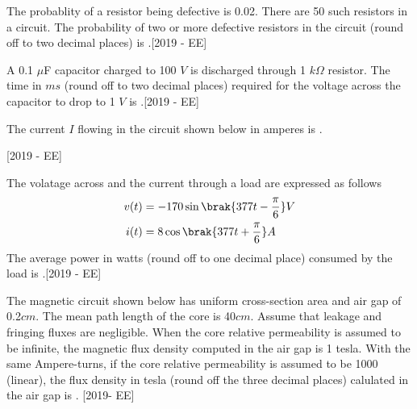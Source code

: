 \iffalse
\title{}
\author{EE24BTECH11053 - S A Aravind Eswar
}
\chapter{2019}
\section{ee}
\fi
    \item The probablity of a resistor being defective is 0.02. There are 50 such resistors in a circuit. The probability of two or more defective resistors in the circuit (round off to two decimal places) is \underline{\hspace{3cm}}.\hfill{[2019 - EE]}
    \item A 0.1 $\mu$F capacitor charged to 100 $V$ is discharged through  1 $k\Omega$ resistor. The time in $ms$ (round off to two decimal places) required for the voltage across the capacitor to drop to 1 $V$ is \underline{\hspace{3cm}}.\hfill{[2019 - EE]}
    \item The current $I$ flowing in the circuit shown below in amperes is \underline{\hspace{3cm}}.\hfill\\\strut\hfill{[2019 - EE]}\\
        \begin{center}
            
        \end{center}
    \item The volatage across and the current through a load are expressed as follows 
        \begin{align*}v(t) &= -170 \sin \brak{377t - \frac{\pi}{6}} V\\i(t) &= 8\cos\brak{377t+\frac{\pi}{6}} A\end{align*}
        The average power in watts (round off to one decimal place) consumed by the load is \underline{\hspace{3cm}}.\hfill{[2019 - EE]}
    \item The magnetic circuit shown below has uniform cross-section area and air gap of 0.2$cm$. The mean path length of the core is 40$cm$. Assume that leakage and fringing fluxes are negligible. When the core relative permeability is assumed to be infinite, the magnetic flux density computed in the air gap is 1 tesla. With the same Ampere-turns, if the core relative permeability is assumed to be 1000 (linear), the flux density in tesla (round off the three decimal places) calulated in the air gap is \underline{\hspace{3cm}}. \hfill{[2019- EE]}
